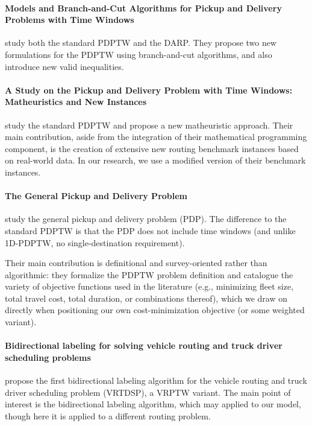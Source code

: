 \documentclass[preprint,11pt,authoryear]{elsarticle}
\begin{document}
\paragraph{\textbf{Models and Branch-and-Cut Algorithms for Pickup and Delivery Problems with Time Windows}}

\citet{ropkeModelsBranchandcutAlgorithms2007} study both the standard PDPTW and the DARP. They propose two new formulations 
for the PDPTW using branch-and-cut algorithms, and also introduce new valid inequalities.


\paragraph{\textbf{A Study on the Pickup and Delivery Problem with Time Windows: Matheuristics and New Instances}}

\citet{sartoriStudyPickupDelivery2020} study the standard PDPTW and propose a new matheuristic approach. Their main contribution, aside from the integration of their mathematical programming component, is the creation of extensive 
new routing benchmark instances based on real-world data. In our research, we use a modified version of their benchmark instances.


\paragraph{\textbf{The General Pickup and Delivery Problem}}

\citet{savelsberghGeneralPickupDelivery1995} study the
general pickup and delivery problem (PDP). The difference to the standard PDPTW
is that the PDP does not include time windows (and unlike 1D-PDPTW, no
single-destination requirement).

Their main contribution is definitional and survey-oriented rather than
algorithmic: they formalize the PDPTW problem definition and catalogue the
variety of objective functions used in the literature (e.g., minimizing fleet
size, total travel cost, total duration, or combinations thereof), which we
draw on directly when positioning our own cost-minimization objective (or some weighted variant).


\paragraph{\textbf{Bidirectional labeling for solving vehicle routing and truck driver scheduling problems}}

\citet{tilkBidirectionalLabelingSolving2020} propose the first bidirectional labeling algorithm for the vehicle routing and truck driver scheduling problem (VRTDSP), a VRPTW variant. 
The main point of interest is the bidirectional labeling algorithm, which may applied to our model, though here it is applied to a different routing problem. 
\end{document}
